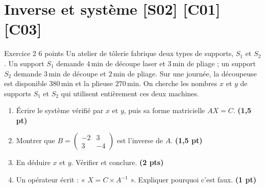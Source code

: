 \documentclass[a4paper,11pt]{article}
\newcommand{\pts}[1]{\hfill{\color{uimmred}\small\textbf{(#1)}}}
\newcommand{\M}[1]{\begin{pmatrix}#1\end{pmatrix}}
\begin{document}
\needspace{8cm}
\section{Inverse et système \hfill {\normalsize\color{uimmred}[S02] [C01] [C03]}}
\begin{exo}{Exercice 2 \hfill 6 points}
\label{ev:2}
Un atelier de tôlerie fabrique deux types de supports, $S_1$ et $S_2$. Un support $S_1$ demande $4$\,min de découpe laser et $3$\,min de pliage ; un support $S_2$ demande $3$\,min de découpe et $2$\,min de pliage. Sur une journée, la découpeuse est disponible $380$\,min et la plieuse $270$\,min. On cherche les nombres $x$ et $y$ de supports $S_1$ et $S_2$ qui utilisent entièrement ces deux machines.
\begin{enumerate}
  \item Écrire le système vérifié par $x$ et $y$, puis sa forme matricielle $AX = C$. \pts{1,5 pt}
  \item Montrer que $B = \M{-2 & 3\\ 3 & -4}$ est l'inverse de $A$. \pts{1,5 pt}
  \item En déduire $x$ et $y$. Vérifier et conclure. \pts{2 pts}
  \item Un opérateur écrit : « $X = C\times A^{-1}$ ». Expliquer pourquoi c'est faux. \pts{1 pt}
\end{enumerate}
\end{exo}

\needspace{8cm}
\end{document}
